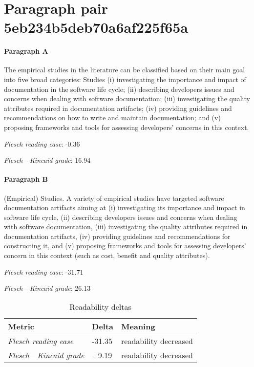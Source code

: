 \newpage
\section{Paragraph pair 5eb234b5deb70a6af225f65a}
\paragraph{Paragraph A}
The empirical studies in the literature can be classified based on their main goal into five broad categories: Studies (i) investigating the importance and impact of documentation in the software life cycle; (ii) describing developers issues and concerns when dealing with software documentation; (iii) investigating the quality attributes required in documentation artifacts; (iv) providing guidelines and recommendations on how to write and maintain documentation; and (v) proposing frameworks and tools for assessing developers' concerns in this context.\par\medskip
\emph{Flesch reading ease}: -0.36\par
\emph{Flesch---Kincaid grade}: 16.94

\paragraph{Paragraph B}
(Empirical) Studies. A variety of empirical studies have targeted software documentation artifacts aiming at (i) investigating its importance and impact in software life cycle, (ii) describing developers issues and concerns when dealing with software documentation, (iii) investigating the quality attributes required in documentation artifacts, (iv) providing guidelines and recommendations for constructing it, and (v) proposing frameworks and tools for assessing developers' concern in this context (such as cost, benefit and quality attributes).\par\medskip
\emph{Flesch reading ease}: -31.71\par
\emph{Flesch---Kincaid grade}: 26.13

\bigskip\begin{table}[!h]
\centering
\begin{tabular}{lll}
\toprule
               \textbf{Metric} & \textbf{Delta} &       \textbf{Meaning} \\
\midrule
    \emph{Flesch reading ease} &         -31.35 &  readability decreased \\
 \emph{Flesch---Kincaid grade} &          +9.19 &  readability decreased \\
\bottomrule
\end{tabular}
\caption*{Readability deltas}\end{table}

